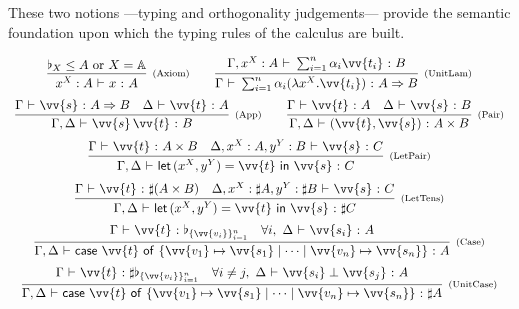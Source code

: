 \documentclass[runningheads,orivec,envcountsame,envcountsect]{llncs}
\newcommand\AbsBasis{\ensuremath{\mathbb{A}}}
\def\scal#1#2{\langle{#1}~|~{#2}\rangle}
\def\Pair#1#2{(#1,#2)} %
\def\Lam#1#2#3{\lambda#1^{#2}{.}#3} %
\def\letkeyword{\mathsf{let}}
\def\inkeyword{\mathsf{in}}
\def\LetP#1#2#3#4#5#6{\letkeyword\,\Pair{#1^{#2}}{#3^{#4}}=#5~\inkeyword~#6}
\def\gencase#1#2#3#4#5{\ensuremath{\mathsf{case}~#1~\mathsf{of}~\{#2\mapsto #4 \mid \dotsb \mid #3\mapsto #5\}}}
\def\Arr{\Rightarrow}
\def\sem#1{\llbracket#1\rrbracket}
\def\TYP#1#2#3{#1~{\vdash}~#2~{:}~#3}
\def\SORTH#1#2#3#4{#1~{\vdash}~#2\perp#3~{:}~#4}
\def\snam#1{\textsc{\scriptsize\upshape(#1)}}
\newcommand\B{\mathbb B}
\newcommand\XB{\mathbb X}
\newcommand\basis[1]{\ensuremath{\flat_{#1}}}
\newcommand\genbasis[3]{\ensuremath{\basis{\{#1\}_{#2}^{#3}}}}
\begin{document}
These two notions ---typing and orthogonality judgements--- provide the
semantic foundation upon which the typing rules of the calculus are built.




\begin{table}[t]
  \[
    \begin{array}{c}
      \infer[\snam{Axiom}]{\TYP{x^{X}:A}{x}{A}}{\basis{X}\leq A \text{ or }X=\AbsBasis}
      \qquad
	\infer[\snam{UnitLam}]{\TYP{\Gamma}{\sum_{i=1}^n \alpha_i (\Lam{x}{{X}}{\vv{t_i}})}{A\Arr B}}
	{\TYP{\Gamma,x^{X}:A}{\sum_{i=1}^{n}\alpha_i\vv{t_i}}{B}}
      \\
      \noalign{\medskip}
      \infer[\snam{App}]{\TYP{\Gamma,\Delta}{\vv{s}\,\vv{t}}{B}}
      {\TYP{\Gamma}{\vv{s}}{A\Arr B} & \TYP{\Delta}{\vv{t}}{A}}
      \qquad
      \infer[\snam{Pair}]{\TYP{\Gamma,\Delta}
      {\Pair{\vv{t}}{\vv{s}}}{A\times B}}{
	\TYP{\Gamma}{\vv{t}}{A}&\TYP{\Delta}{\vv{s}}{B}
      }
      \\
      \noalign{\medskip}
      \infer[\snam{LetPair}]{\TYP{\Gamma,\Delta} 
      {\LetP{x}{{X}}{y}{{Y}}{\vv{t}}{\vv{s}}}{C}}{
	\TYP{\Gamma}{\vv{t}}{A\times B}&
	\TYP{\Delta,x^{{X}}:A,y^{Y}:B}{\vv{s}}{C}
      }\\
      \noalign{\medskip}
      \infer[\snam{LetTens}]{\TYP{\Gamma,\Delta}
      {\LetP{x}{{X}}{y}{{Y}}{\vv{t}}{\vv{s}}}{\sharp C}}{
	\TYP{\Gamma}{\vv{t}}{\sharp(A\times B)}&
	\TYP{\Delta,x^{X}:\sharp A,y^{Y}:\sharp B}{\vv{s}}{C}
      }\\
      \noalign{\medskip}
      \infer[\snam{Case}]{\TYP{\Gamma,\Delta}
      {\gencase{\vv{t}}{\vv{v_1}}{\vv{v_n}}{\vv{s_1}}{\vv{s_n}}}{A}}{
	\TYP{\Gamma}{\vv{t}}{\genbasis{\vv{v_i}}{i=1}{n}}&
	\forall i,\ \TYP{\Delta}{\vv{s_i}}{A}
      }\\
      \noalign{\medskip}
      \infer[\snam{UnitCase}]{\TYP{\Gamma,\Delta}
      {\gencase{\vv{t}}{\vv{v_1}}{\vv{v_n}}{\vv{s_1}}{\vv{s_n}}}{\sharp A}}{
	\TYP{\Gamma}{\vv{t}}{\sharp \genbasis{\vv{v_i}}{i=1}{n}}&
	\forall i\neq j,\ \SORTH{\Delta}{\vv{s_i}}{\vv{s_j}}{A}
}
\end{array}\]
\end{table}
\end{document}
